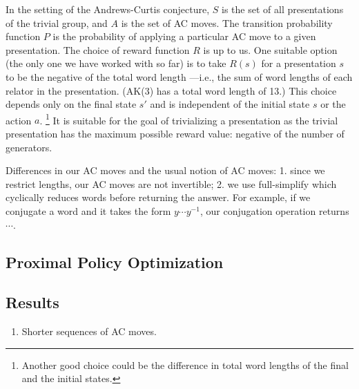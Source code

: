 In the setting of the Andrews-Curtis conjecture, $S$ is the set of all presentations of the trivial group, and $A$ is the set of AC moves.
The transition probability function $P$ is the probability of applying a particular AC move to a given presentation.
The choice of reward function $R$ is up to us.
One suitable option (the only one we have worked with so far) is to take $R(s)$ for a presentation $s$ to be the negative of the total word length ---i.e., the sum of word lengths of each relator in the presentation.
(AK(3) has a total word length of 13.)
This choice depends only on the final state $s'$ and is independent of the initial state $s$
or the action $a$.
\footnote{Another good choice could be the difference in total word lengths of the final and the initial states.} It is suitable for the goal of trivializing a presentation as the trivial presentation has the maximum possible reward value: negative of the number of generators.

Differences in our AC moves and the usual notion of AC moves: 1.
since we restrict lengths, our AC moves are not invertible; 2.
we use full-simplify which cyclically reduces words before returning the answer.
For example, if we conjugate a word and it takes the form $y \cdots y^{-1}$, our conjugation operation returns $\cdots$.


\subsection{Proximal Policy Optimization}


\subsection{Results}

\begin{enumerate}
\item Shorter sequences of AC moves. 
\end{enumerate}
